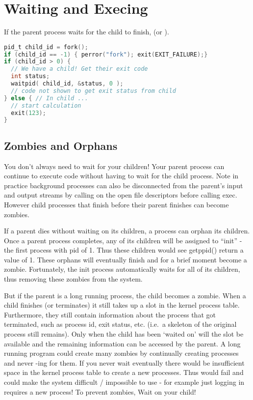 \section{Waiting and Execing}\label{waiting-and-execing}

If the parent process waits for the child to finish,  (or ).

\begin{lstlisting}[language=C]
pid_t child_id = fork();
if (child_id == -1) { perror("fork"); exit(EXIT_FAILURE);}
if (child_id > 0) { 
  // We have a child! Get their exit code
  int status; 
  waitpid( child_id, &status, 0 );
  // code not shown to get exit status from child
} else { // In child ...
  // start calculation
  exit(123);
}
\end{lstlisting}

\subsection{Zombies and Orphans}

You don't always need to wait for your children! Your parent process can continue to execute code without having to wait for the child process. Note in practice background processes can also be disconnected from the parent's input and output streams by calling  on the open file descriptors before calling exec. However child processes that finish before their parent finishes can become zombies.

If a parent dies without waiting on its children, a process can orphan its children. Once a parent process completes, any of its children will be assigned to ``init'' - the first process with pid of 1. Thus these children would see getppid() return a value of 1. These orphans will eventually finish and for a brief moment become a zombie. Fortunately, the init process automatically waits for all of its children, thus removing these zombies from the system.

But if the parent is a long running process, the child becomes a zombie. When a child finishes (or terminates) it still takes up a slot in the kernel process table. Furthermore, they still contain information about the process that got terminated, such as process id, exit status, etc. (i.e.~a skeleton of the original process still remains). Only when the child has been `waited on' will the slot be available and the remaining information can be accessed by the parent. A long running program could create many zombies by continually creating processes and never -ing for them. If you never wait eventually there would be insufficient space in the kernel process table to create a new processes. Thus  would fail and could make the system difficult / impossible to use - for example just logging in requires a new process! To prevent zombies, Wait on your child!

